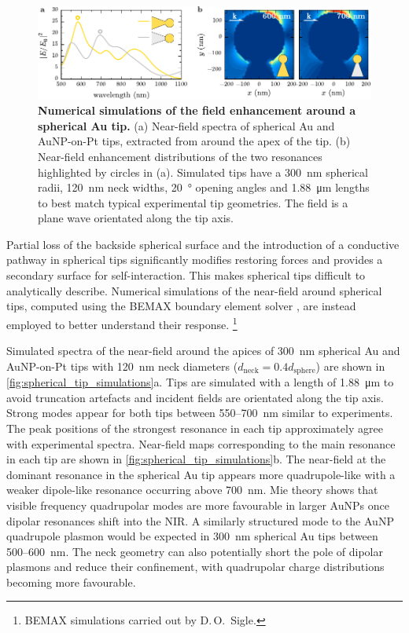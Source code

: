 \documentclass{article}
\begin{document}
\begin{figure}[bt]
\centering
\includegraphics{figures/spherical_tip_simulations}
\caption[Numerical simulations of the field enhancement around a spherical Au tip]{\textbf{Numerical simulations of the field enhancement around a spherical Au tip.} (a) Near-field spectra of spherical Au and AuNP-on-Pt tips, extracted from around the apex of the tip. (b) Near-field enhancement distributions of the two resonances highlighted by circles in (a). Simulated tips have a \SI{300}{nm} spherical radii, \SI{120}{nm} neck widths, \SI{20}{\degree} opening angles and \SI{1.88}{\micro\metre} lengths to best match typical experimental tip geometries. The field is a plane wave orientated along the tip axis.}
\label{fig:spherical_tip_simulations}
\end{figure}

Partial loss of the backside spherical surface and the introduction of a conductive pathway in spherical tips significantly modifies restoring forces and provides a secondary surface for self-interaction. This makes spherical tips difficult to analytically describe. Numerical simulations of the near-field around spherical tips, computed using the BEMAX boundary element solver \cite{deabajo1998relativistic, deabajo2002retarded}, are instead employed to better understand their response.%
\footnote{BEMAX simulations carried out by D.\,O.\ Sigle.}

Simulated spectra of the near-field around the apices of \SI{300}{nm} spherical Au and AuNP-on-Pt tips with \SI{120}{nm} neck diameters ($d_{\mathrm{neck}}=0.4d_{\mathrm{sphere}}$) are shown in \autoref{fig:spherical_tip_simulations}a. Tips are simulated with a length of \SI{1.88}{\micro\metre} to avoid truncation artefacts and incident fields are orientated along the tip axis. Strong modes appear for both tips between 550--\SI{700}{nm} similar to experiments. The peak positions of the strongest resonance in each tip approximately agree with experimental spectra. Near-field maps corresponding to the main resonance in each tip are shown in \autoref{fig:spherical_tip_simulations}b. The near-field at the dominant resonance in the spherical Au tip appears more quadrupole-like with a weaker dipole-like resonance occurring above \SI{700}{nm}.
Mie theory shows that visible frequency quadrupolar modes are more favourable in larger AuNPs once dipolar resonances shift into the NIR. A similarly structured mode to the AuNP quadrupole plasmon would be expected in \SI{300}{nm} spherical Au tips between 500--\SI{600}{nm}. The neck geometry can also potentially short the pole of dipolar plasmons and reduce their confinement, with quadrupolar charge distributions becoming more favourable.
\end{document}
